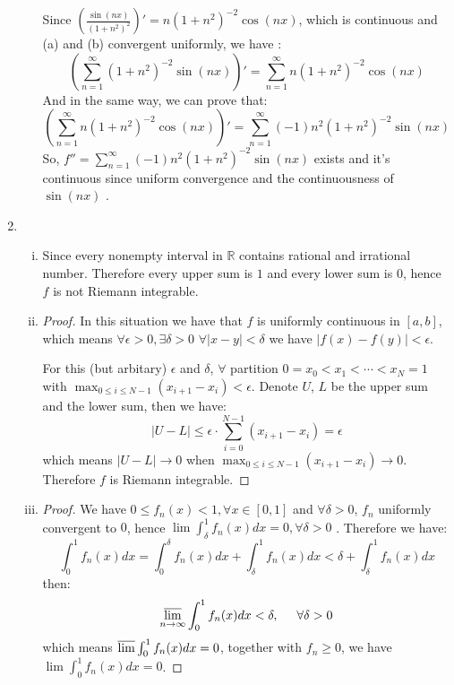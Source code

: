\documentclass[11pt]{article}
\begin{document}
\begin{enumerate}[1]
\begin{enumerate}[(i)]
		Since $(\frac{\sin(n x)}{(1+n^2)^2})' = n (1+n^2)^{-2} \cos(n x)$, which is continuous and (a) and (b)
		convergent uniformly, we have \cite{deriv}:
		$$\left( \sum_{n=1}^{\infty} (1+n^2)^{-2} \sin(n x) \right)' = \sum_{n=1}^{\infty} n (1+n^2)^{-2} \cos(n x)$$
		And in the same way, we can prove that:
		$$\left( \sum_{n=1}^{\infty} n (1+n^2)^{-2} \cos(n x) \right)' = \sum_{n=1}^{\infty} (-1) n^2 (1+n^2)^{-2} \sin(n x)$$
		So, $f'' = \sum_{n=1}^{\infty} (-1) n^2 (1+n^2)^{-2} \sin(n x)$ exists and it's continuous since uniform convergence and the continuousness of $\sin (nx)$ \cite{contin}. 
	\end{enumerate}
	\item
	\begin{enumerate}[(i)]
		\item 
		Since every nonempty interval in $\mathbb{R}$ contains rational and irrational number. Therefore every upper sum is $1$ and every lower sum is $0$, hence $f$ is not Riemann integrable.
		\item
		\begin{proof}
			In this situation we have that $f$ is uniformly continuous \cite{uniform} in $[a,b]$, which means
			$\forall \epsilon > 0, \exists \delta > 0$ $\forall |x - y| < \delta$
			we have $|f(x) - f(y)| < \epsilon$. 
			
			For this (but arbitary) $\epsilon$ and $\delta$, $\forall$ partition
			$0 = x_0 < x_1 < \cdots < x_N = 1$  with $\max_{0 \le i \le N-1} (x_{i+1} - x_i) < \epsilon$.
			Denote $U$, $L$ be the upper sum and the lower sum, then we have:
			$$|U - L| \le \epsilon \cdot \sum_{i=0}^{N-1} (x_{i+1} - x_i) = \epsilon$$
			which means $|U - L| \to 0$ when $\max_{0 \le i \le N-1} (x_{i+1} - x_i) \to 0$. 
			Therefore $f$ is Riemann integrable. 	
		\end{proof} 
		\item 
		\begin{proof}
			We have $0 \le f_n(x) < 1, \forall x \in [0,1]$ and $\forall \delta > 0$, $f_n$
			uniformly convergent to $0$, hence $\lim \int_\delta^1 f_n(x) d x = 0, \forall \delta > 0$ \cite{integ}.
			Therefore we have:
			$$\int_0^1 f_n(x) d x = \int_0^\delta f_n(x) d x + \int_\delta^1 f_n(x) d x < \delta + \int_\delta^1 f_n(x) d x$$
			then:
			$$\varlimsup_{n\to\infty} \int_0^1 f_n(x) d x < \delta, \hspace{0.5cm} \forall \delta > 0$$
			which means $\varlimsup \int_0^1 f_n(x) d x = 0$, together with $f_n \ge 0$,
			we have $\lim \int_0^1 f_n(x) d x = 0$.
		\end{proof} 
	\end{enumerate}
\end{enumerate}
\end{document}
